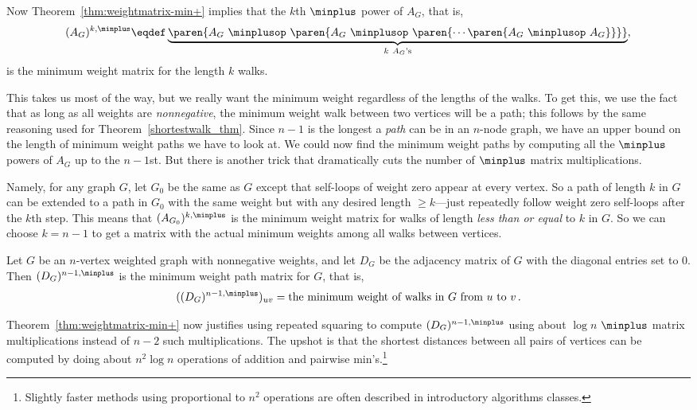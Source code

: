 Now Theorem~\ref{thm:weightmatrix-min+} implies that the $k$th $\minplus$ power
of $A_G$, that is,
\[
(A_G)^{k, \minplus} \eqdef \underbrace{\paren{A_G\ \minplusop\ \paren{A_G\
      \minplusop\ \paren{\cdots \paren{A_G\ \minplusop\ A_G}} }}}_{k\ A_G\text{'s}},
\]
is the minimum weight matrix for the length $k$ walks.

This takes us most of the way, but we really want the minimum weight
regardless of the lengths of the walks.  To get this, we use the fact
that as long as all weights are \emph{nonnegative}, the minimum weight
walk between two vertices will be a path; this follows by the same
reasoning used for Theorem~\ref{shortestwalk_thm}.  Since $n-1$ is the
longest a \emph{path} can be in an $n$-node graph, we have an upper
bound on the length of minimum weight paths we have to look at.  We
could now find the minimum weight paths by computing all the
$\minplus$ powers of $A_G$ up to the $n-1$st.  But there is another
trick that dramatically cuts the number of $\minplus$ matrix
multiplications.

Namely, for any graph $G$, let $G_0$ be the same as $G$ except that
self-loops of weight zero appear at every vertex.  So a path of length $k$
in $G$ can be extended to a path in $G_0$ with the same weight but with
any desired length $\geq k$---just repeatedly follow weight zero
self-loops after the $k$th step.  This means that $(A_{G_0})^{k, \minplus}$
is the minimum weight matrix for walks of length \emph{less than or equal}
to $k$ in $G$.  So we can choose $k = n-1$ to get a matrix with the
actual minimum weights among all walks between vertices.

\begin{theorem}\label{thm:minweightmatrix}
Let $G$ be an $n$-vertex weighted graph with nonnegative weights, and let
$D_G$ be the adjacency matrix of $G$ with the diagonal entries set to 0.
Then $(D_G)^{n-1, \minplus}$ is the minimum weight path matrix for $G$, that
is,
\[
((D_G)^{n-1, \minplus})_{uv} = \text{the minimum weight of walks in $G$ from
 $u$ to $v$}\,.
\]
\end{theorem}
Theorem~\ref{thm:weightmatrix-min+} now justifies using repeated
squaring to compute $(D_G)^{n-1, \minplus}$ using about $\log n$
$\minplus$ matrix multiplications instead of $n-2$ such
multiplications.  The upshot is that the shortest distances between
all pairs of vertices can be computed by doing about $n^2\log n$
operations of addition and pairwise min's.\footnote{Slightly faster
  methods using proportional to $n^2$ operations are often described
  in introductory algorithms classes.}


